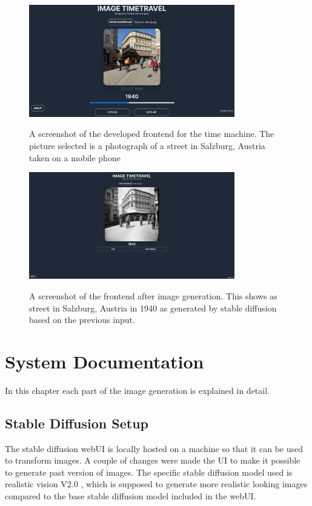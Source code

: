 \documentclass[english,notitlepage,smartquotes]{hgbreport}
\begin{document}
\begin{figure}[htbp]
    \centering\small
    {\includegraphics[width=0.8\textwidth]{images/frontendPre.png}}
    \caption{A screenshot of the developed frontend for the time machine. The picture selected is a photograph of a street in Salzburg, Austria taken on a mobile phone}
    \label{fig:frontendPre}
\end{figure}

\begin{figure}[htbp]
    \centering\small
    {\includegraphics[width=0.8\textwidth]{images/frontendPost.png}}
    \caption{A screenshot of the frontend after image generation. This shows as street in Salzburg, Austria in 1940 as generated by stable diffusion based on the previous input.}
    \label{fig:frontendPost}
\end{figure}

\chapter{System Documentation}
\label{systemDocu}
In this chapter each part of the image generation is explained in detail.

\section{Stable Diffusion Setup}
The stable diffusion webUI \cite{webui} is locally hosted on a machine so that it can be used to transform images. A couple of changes were made the UI to make it possible to generate past version of images.
The specific stable diffusion model used is realistic vision V2.0 \cite{realisticVision}, which is supposed to generate more realistic looking images compared to the base stable diffusion model included in the webUI.
\end{document}
